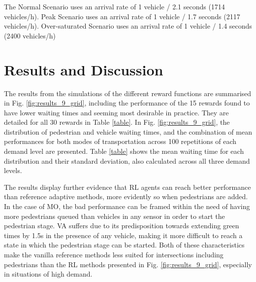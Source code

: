 \documentclass[conference]{IEEEtran}
\begin{document}
The Normal Scenario uses an arrival rate of 1 vehicle / 2.1 seconds (1714 vehicles/h). Peak Scenario uses an arrival rate of 1 vehicle / 1.7 seconds (2117 vehicles/h). Over-saturated Scenario uses an arrival rate of 1 vehicle / 1.4 seconds (2400 vehicles/h)


\section{Results and Discussion}
\label{results}
The results from the simulations of the different reward functions are summarised in Fig. \ref{fig:results_9_grid}, including the performance of the 15 rewards found to have lower waiting times and seeming most desirable in practice. They are detailed for all 30 rewards in Table \ref{table}.
In Fig. \ref{fig:results_9_grid}, the distribution of pedestrian and vehicle waiting times, and the combination of mean performances for both modes of transportation across 100 repetitions of each demand level are presented.
Table \ref{table} shows the mean waiting time for each distribution and their standard deviation, also calculated across all three demand levels. 

The results display further evidence that RL agents can reach better performance than reference adaptive methods, more evidently so when pedestrians are added.
In the case of MO, the bad performance can be framed within the need of having more pedestrians queued than vehicles in any sensor in order to start the pedestrian stage.
VA suffers due to its predisposition towards extending green times by 1.5s in the presence of any vehicle, making it more difficult to reach a state in which the pedestrian stage can be started.
Both of these characteristics make the vanilla reference methods less suited for intersections including pedestrians than the RL methods presented in Fig. \ref{fig:results_9_grid}, especially in situations of high demand.
\end{document}
